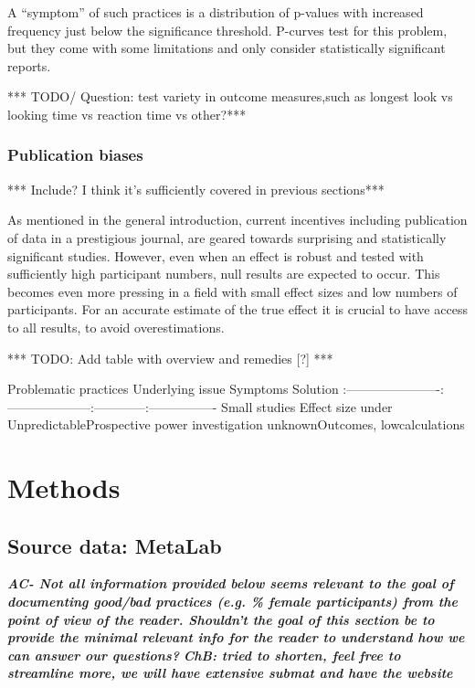 \documentclass[english,floatsintext,man]{apa6}
\begin{document}
A \enquote{symptom} of such practices is a distribution of p-values with
increased frequency just below the significance threshold. P-curves test
for this problem, but they come with some limitations and only consider
statistically significant reports.

*** TODO/ Question: test variety in outcome measures,such as longest
look vs looking time vs reaction time vs other?***

\subsubsection{Publication biases}\label{publication-biases}

*** Include? I think it's sufficiently covered in previous sections***

As mentioned in the general introduction, current incentives including
publication of data in a prestigious journal, are geared towards
surprising and statistically significant studies. However, even when an
effect is robust and tested with sufficiently high participant numbers,
null results are expected to occur. This becomes even more pressing in a
field with small effect sizes and low numbers of participants. For an
accurate estimate of the true effect it is crucial to have access to all
results, to avoid overestimations.

*** TODO: Add table with overview and remedies {[}?{]} ***

\textbar{}Problematic practices \textbar{}Underlying issue
\textbar{}Symptoms \textbar{}Solution \textbar{}
\textbar{}:----------------------\textbar{}:--------------------\textbar{}:------------\textbar{}:----------------\textbar{}
\textbar{}Small studies \textbar{}Effect size under
\textbar{}Unpredictable\textbar{}Prospective power\textbar{} \textbar{}
\textbar{}investigation unknown\textbar{}Outcomes,
low\textbar{}calculations \textbar{}

\section{Methods}\label{methods}

\subsection{Source data: MetaLab}\label{source-data-metalab}

\textbf{\emph{AC- Not all information provided below seems relevant to
the goal of documenting good/bad practices (e.g. \% female participants)
from the point of view of the reader. Shouldn't the goal of this section
be to provide the minimal relevant info for the reader to understand how
we can answer our questions?}} \textbf{\emph{ChB: tried to shorten, feel
free to streamline more, we will have extensive submat and have the
website}}
\end{document}
